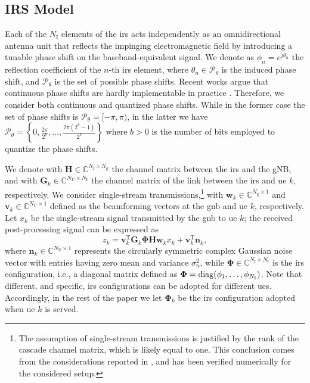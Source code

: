 \subsection{IRS Model}\label{sec:irsmodel}
Each of the $N_{\mathrm I}$ elements of the \gls{irs} acts independently as an omnidirectional antenna unit that reflects the impinging electromagnetic field by introducing a tunable phase shift on the baseband-equivalent signal. We denote as $\phi_n=e^{j\theta_n}$ the reflection coefficient of the $n$-th \gls{irs} element, where $\theta_n \in \mathcal{P}_{\theta}$ is the induced phase shift, and $\mathcal{P}_{\theta}$ is the set of possible phase shifts. 
Recent works argue that continuous phase shifts are hardly implementable in practice \cite{Tan2018}. Therefore, we consider both continuous and quantized phase shifts. While in the former case the set of phase shifts is $\mathcal{P}_{\theta}= [-\pi, \pi)$, in the latter we have 
$\mathcal{P}_{\theta} = \left\{0, \frac{2\pi}{2^b},\ldots,\frac{2\pi(2^b-1)}{2^b} \right\}$ where $b>0$ is the number of bits employed to quantize the phase shifts. 

We denote with $\bm{H} \in \mathbb{C}^{N_{\mathrm I} \times N_{\mathrm g}}$ the channel matrix between the \gls{irs} and the gNB, and with $\bm{G}_k \in \mathbb{C}^{N_{\mathrm U} \times N_{\mathrm I}}$ the channel matrix of the link between the \gls{irs} and \gls{ue} $k$, respectively.
We consider single-stream transmissions,\footnote{The assumption of single-stream transmissions is justified by the rank of the cascade channel matrix, which is likely equal to one. This conclusion comes from the considerations reported in \cite{he2020cascaded, rains2023ris,rappaport2017investigation}, and has been verified numerically for the considered setup.} with $\bm{w}_k \in \mathbb{C}^{N_{\mathrm g}\times 1}$ and $\bm{v}_k\in \mathbb{C}^{N_{\mathrm U}\times 1}$ defined as the beamforming vectors at the \gls{gnb} and \gls{ue} $k$, respectively.
Let $x_k$ be the single-stream signal transmitted by the \gls{gnb} to \gls{ue} $k$; the received post-processing signal can be expressed as
\begin{equation}
    z_k = \bm{v}_k^{\mathrm T} \bm{G}_k \bm{\Phi} \bm{H}  \bm{w}_kx_k + \bm{v}_k^{\mathrm T} \bm{n}_{k},
\end{equation}
where $\bm{n}_k\in \mathbb{C}^{N_{\mathrm U}\times 1}$ represents the circularly symmetric complex Gaussian noise vector with entries having zero mean and variance $\sigma^2_{n}$, while $\bm{\Phi} \in \mathbb{C}^{N_{\mathrm I}\times N_{\mathrm I}}$ is the {\gls{irs} configuration}, i.e., a diagonal matrix defined as $\bm{\Phi} = \operatorname*{diag}(\phi_1,\ldots,\phi_{N_{\mathrm I}})$.
Note that different, and specific, \gls{irs} configurations can be adopted for different \glspl{ue}. Accordingly, in the rest of the paper we let $\bm{\Phi}_k$ be the \gls{irs} configuration adopted when \gls{ue} $k$ is served.

